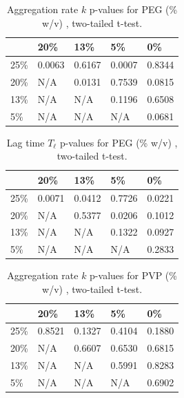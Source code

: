 \begin{table}[b!]
  \caption[Aggregation rate p-values for PEG.]{Aggregation rate $k$ p-values for PEG (\% w/v) , two-tailed t-test.}
    \label{table:p-k-values-peg}
    \begin{tabular}{p{2cm}|p{3cm}p{3cm}p{3cm}p{3cm}}
        &20\% &  13\% & 5\% & 0\% \\ \hline
	25\% & 0.0063 & 0.6167 & 0.0007 &0.8344\\
	20\% & N/A &0.0131 & 0.7539 & 0.0815\\
     	13\% & N/A  & N/A & 0.1196 & 0.6508\\
      	5\% & N/A & N/A  & N/A & 0.0681\\
    \end{tabular}
\end{table}

\begin{table}[b!]
  \caption[Lag time p-values for PEG.]{Lag time $T_\ell$ p-values for PEG (\% w/v) , two-tailed t-test.}
    \label{table:p-tl-values-peg}
    \begin{tabular}{p{2cm}|p{3cm}p{3cm}p{3cm}p{3cm}}
        &20\% &  13\% & 5\% & 0\% \\ \hline
	25\% & 0.0071 & 0.0412 & 0.7726 &0.0221\\
	20\% & N/A &0.5377 &  0.0206 & 0.1012\\
     	13\% & N/A  & N/A & 0.1322 & 0.0927\\
      	5\% & N/A & N/A  & N/A &0.2833\\
    \end{tabular}
\end{table}

\begin{table}[b!]
  \caption[Aggregation rate p-values for PVP.]{Aggregation rate $k$ p-values for PVP (\% w/v) , two-tailed t-test.}
    \label{table:p-k-values-peg}
    \begin{tabular}{p{2cm}|p{3cm}p{3cm}p{3cm}p{3cm}}
        &20\% &  13\% & 5\% & 0\% \\ \hline
	25\% & 0.8521 & 0.1327 & 0.4104 &0.1880\\
	20\% & N/A &0.6607 & 0.6530 & 0.6815\\
     	13\% & N/A  & N/A & 0.5991 & 0.8283\\
      	5\% & N/A & N/A  & N/A & 0.6902\\
    \end{tabular}
\end{table}

